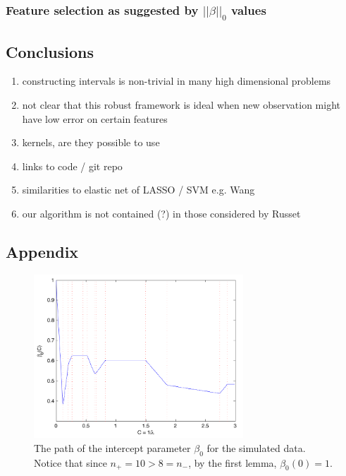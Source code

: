 \documentclass[10pt]{article}
\theoremstyle{definition}
\begin{document}
\subsubsection{Feature selection as suggested by $||\beta||_0$ values}



\subsection{Conclusions}
\begin{enumerate}
\item constructing intervals is non-trivial in many high dimensional problems
\item not clear that this robust framework is ideal when new observation might have low error on certain features
\item kernels, are they possible to use
\item links to code / git repo
\item similarities to elastic net of LASSO / SVM e.g. Wang \cite{wang2007hybrid}
\item our algorithm is not contained (?) in those considered by Russet \cite{rosset2007piecewise}
\end{enumerate}


\subsection{Appendix}
\begin{center}
\begin{figure}[!h]
   \centering
   \includegraphics[width=0.7\textwidth]{./beta0Path.pdf} 
      \caption{The path of the intercept parameter $\beta_0$ for the simulated data. Notice that since $n_+=10>8=n_-$, by the first lemma, $\beta_0(0)=1$.}
   \label{fig:beta0Path}
\end{figure}
\end{center}
\end{document}
